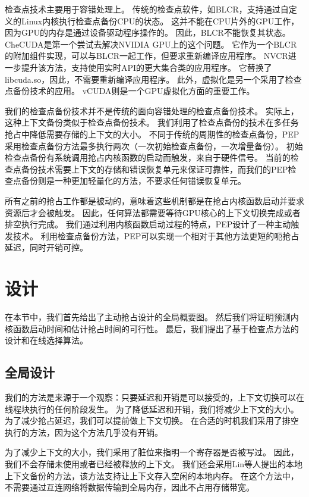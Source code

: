 检查点技术主要用于容错处理上。
传统的检查点软件，如BLCR，支持通过自定义的Linux内核执行检查点备份CPU的状态。
这并不能在CPU片外的GPU工作，因为GPU的内存是通过设备驱动程序操作的。
因此，BLCR不能恢复其状态。
CheCUDA是第一个尝试去解决NVIDIA GPU上的这个问题。
它作为一个BLCR的附加组件实现，可以与BLCR一起工作，但要求重新编译应用程序。
NVCR进一步提升该方法，支持使用实时API的更大集合类的应用程序。
它替换了libcuda.so，因此，不需要重新编译应用程序。
此外，虚拟化是另一个采用了检查点备份技术的应用。
vCUDA则是一个GPU虚拟化方面的重要工作。

我们的检查点备份技术并不是传统的面向容错处理的检查点备份技术。
实际上，这种上下文备份类似于检查点备份技术。
我们利用了检查点备份的技术在多任务抢占中降低需要存储的上下文的大小。
不同于传统的周期性的检查点备份，PEP采用检查点备份方法最多执行两次（一次初始检查点备份，一次增量备份）。
初始检查点备份有系统调用抢占内核函数的启动而触发，来自于硬件信号。
当前的检查点备份技术需要上下文的存储和错误恢复单元来保证可靠性，而我们的PEP检查点备份则是一种更加轻量化的方法，不要求任何错误恢复单元。

所有之前的抢占工作都是被动的，意味着这些机制都是在抢占内核函数启动并要求资源后才会被触发。
因此，任何算法都需要等待GPU核心的上下文切换完成或者排空执行完成。
我们通过利用内核函数启动过程的特点，PEP设计了一种主动触发技术。
利用检查点备份方法，PEP可以实现一个相对于其他方法更短的呃抢占延迟，同时开销可控。

\section{设计}
在本节中，我们首先给出了主动抢占设计的全局概要图。
然后我们将证明预测内核函数启动时间和估计抢占时间的可行性。
最后，我们提出了基于检查点方法的设计和在线选择算法。

\subsection{全局设计}
我们的方法是来源于一个观察：只要延迟和开销是可以接受的，上下文切换可以在线程块执行的任何阶段发生。
为了降低延迟和开销，我们将减少上下文的大小。
为了减少抢占延迟，我们可以提前做上下文切换。
在合适的时机我们采用了排空执行的方法，因为这个方法几乎没有开销。

为了减少上下文的大小，我们采用了脏位来指明一个寄存器是否被写过。
因此，我们不会存储未使用或者已经被释放的上下文。
我们还会采用Lin等人提出的本地上下文备份的方法，该方法支持让上下文存入空闲的本地内存。
在这个方法中，不需要通过互连网络将数据传输到全局内存，因此不占用存储带宽。

